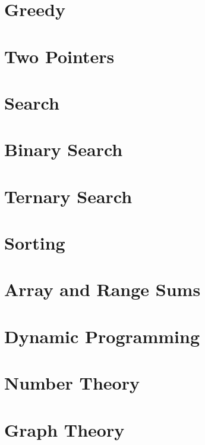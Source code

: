 \documentclass{article}
\begin{document}
\section{Greedy}
\section{Two Pointers}
\section{Search}
\section*{Binary Search}
\section*{Ternary Search}
\section{Sorting}
\section{Array and Range Sums}
\section{Dynamic Programming}
\section{Number Theory}
\section{Graph Theory}
\end{document}
